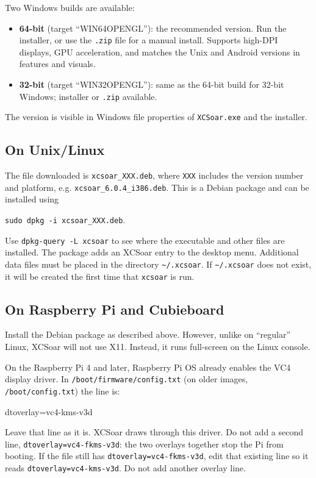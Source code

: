 Two Windows builds are available:
\begin{itemize}
\item \textbf{64-bit} (target ``WIN64OPENGL''): the recommended
  version. Run the installer, or use the \verb|.zip| file for a manual
  install. Supports high-DPI displays, GPU acceleration, and matches the
  Unix and Android versions in features and visuals.
\item \textbf{32-bit} (target ``WIN32OPENGL''): same as the 64-bit
  build for 32-bit Windows; installer or \verb|.zip| available.
\end{itemize}

The version is visible in Windows file properties of
\texttt{XCSoar.exe} and the installer.

\subsection*{On Unix/Linux}

The file downloaded is \verb|xcsoar_XXX.deb|, where \verb|XXX| includes
the version number and platform, e.g. \verb|xcsoar_6.0.4_i386.deb|.
This is a Debian package and can be installed using
\begin{center}
\verb|sudo dpkg -i xcsoar_XXX.deb|.
\end{center}
Use \verb|dpkg-query -L xcsoar| to see where the executable and
other files are installed.
The package adds an XCSoar entry to the desktop menu.
Additional data files must be placed in the directory
\verb|~/.xcsoar|.
If \verb|~/.xcsoar| does not exist, it will be created the first time
that \verb|xcsoar| is run.

\subsection*{On Raspberry Pi and Cubieboard}

Install the Debian package as described above.  However, unlike on
``regular'' Linux, XCSoar will not use X11.  Instead, it runs
full-screen on the Linux console.

On the Raspberry Pi 4 and later, Raspberry Pi OS already enables the
VC4 display driver.  In \texttt{/boot/firmware/config.txt} (on older
images, \texttt{/boot/config.txt}) the line is:

\begin{verbatim*}
dtoverlay=vc4-kms-v3d
\end{verbatim*}

Leave that line as it is.  XCSoar draws through this driver.  Do not
add a second line, \texttt{dtoverlay=vc4-fkms-v3d}: the two overlays
together stop the Pi from booting.  If the file still has
\texttt{dtoverlay=vc4-fkms-v3d}, edit that existing line so it reads
\texttt{dtoverlay=vc4-kms-v3d}.  Do not add another overlay line.


